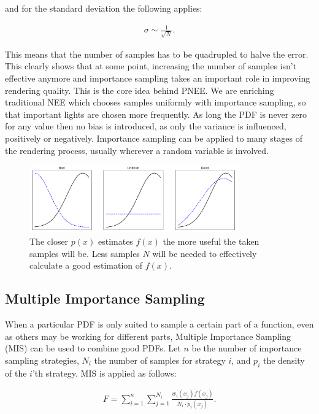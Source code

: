 and for the standard deviation the following applies:

\begin{align}
 \sigma \sim \frac{1}{\sqrt{N}}.
\end{align}

This means that the number of samples has to be quadrupled to halve the error. This clearly shows that at some point, increasing the number of samples isn't effective anymore and importance sampling takes an important role in improving rendering quality. This is the core idea behind PNEE. We are enriching traditional NEE which chooses samples uniformly with importance sampling, so that important lights are chosen more frequently. As long the PDF is never zero for any value then no bias is introduced, as only the variance is influenced, positively or negatively. Importance sampling can be applied to many stages of the rendering process, usually wherever a random variable is involved. 


\begin{figure}
    \centering
    \includegraphics[width=0.8\textwidth]{figures/plots/importancesampling.pdf}
    \caption{The closer $p(x)$ estimates $f(x)$ the more useful the taken samples will be. Less samples $N$ will be needed to effectively calculate a good estimation of $f(x)$.   }
    \label{fig:importancesample}
\end{figure}

\subsection{Multiple Importance Sampling}

When a particular PDF is only suited to sample a certain part of a function, even as others may be working for different parts, Multiple Importance Sampling (MIS) can be used to combine good PDFs. Let $n$ be the number of importance sampling strategies, $N_i$ the number of samples for strategy $i$, and $p_i$ the density of the $i$'th strategy. MIS is applied as follows:

\begin{align}
F = \sum_{i=1}^{n}\sum_{j=1}^{N_i}\frac{w_i(x_j)f(x_j)}{N_i \cdot p_i(x_j)}.
\end{align}

